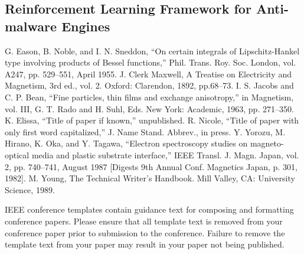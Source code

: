 \documentclass[11pt,conference]{IEEEtran}
\begin{document}
\subsection{Reinforcement Learning Framework for Anti-malware Engines}


\begin{thebibliography}{00}
 G. Eason, B. Noble, and I. N. Sneddon, ``On certain integrals of Lipschitz-Hankel type involving products of Bessel functions,'' Phil. Trans. Roy. Soc. London, vol. A247, pp. 529--551, April 1955.
 J. Clerk Maxwell, A Treatise on Electricity and Magnetism, 3rd ed., vol. 2. Oxford: Clarendon, 1892, pp.68--73.
 I. S. Jacobs and C. P. Bean, ``Fine particles, thin films and exchange anisotropy,'' in Magnetism, vol. III, G. T. Rado and H. Suhl, Eds. New York: Academic, 1963, pp. 271--350.
 K. Elissa, ``Title of paper if known,'' unpublished.
 R. Nicole, ``Title of paper with only first word capitalized,'' J. Name Stand. Abbrev., in press.
 Y. Yorozu, M. Hirano, K. Oka, and Y. Tagawa, ``Electron spectroscopy studies on magneto-optical media and plastic substrate interface,'' IEEE Transl. J. Magn. Japan, vol. 2, pp. 740--741, August 1987 [Digests 9th Annual Conf. Magnetics Japan, p. 301, 1982].
 M. Young, The Technical Writer's Handbook. Mill Valley, CA: University Science, 1989.
\end{thebibliography}
\vspace{12pt}
\color{red}
IEEE conference templates contain guidance text for composing and formatting conference papers. Please ensure that all template text is removed from your conference paper prior to submission to the conference. Failure to remove the template text from your paper may result in your paper not being published.
\end{document}
